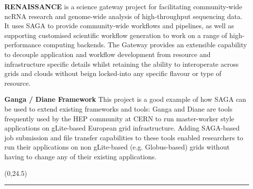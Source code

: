 \documentclass[a0b,portrait]{a0poster}
\def\LHead#1{\bigskip\bigskip\noindent{\huge\color{HeadColor} #1}\smallskip}
\begin{document}
\begin{textblock}{7}
\textbf{\color{DarkBlue} RENAISSANCE} is a science gateway project for
facilitating community-wide ncRNA research and genome-wide analysis of
high-throughput sequencing data. It uses SAGA to provide
community-wide workflows and pipelines, as well as supporting
customised scientific workflow generation to work on a range of
high-performance computing backends. The Gateway provides an
extensible capability to decouple application and workflow development
from resource and infrastructure specific details whilst retaining the
ability to interoperate across grids and clouds without beign
locked-into any specific flavour or type of resource.



\textbf{\color{DarkBlue} Ganga / Diane Framework } This project is a good
example of how SAGA can be used to extend existing frameworks and tools: Ganga
and Diane are tools frequently used by the HEP community at CERN to run
master-worker style applications on  gLite-based European grid infrastructure.
Adding SAGA-based job submission and file transfer capabilities to these tools
enabled researchers to run their applications on non gLite-based (e.g.
Globus-based) grids without having to change any of their existing
applications.




\end{textblock}

\begin{textblock}{15}(0,24.5)
\color{LightGray}
\rule{\linewidth}{2pt}
\end{textblock}
\end{document}
